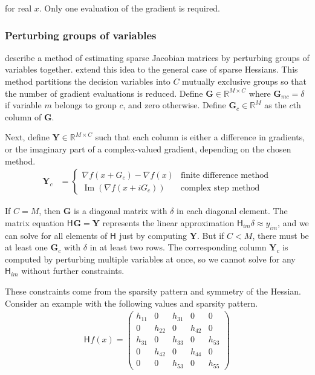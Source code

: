 \documentclass[jss]{jss}\usepackage[]{graphicx}\usepackage[]{color}
\newcommand{\hess}[2]{\mathsf{H}_{#1}#2}
\newcommand{\Mat}[1]{\mathbf{#1}}
\newcommand{\Real}[1]{\mathbb{R}^{#1}}
\DeclareMathOperator{\Imag}{Im}
\begin{document}
for real $x$.  Only one evaluation of the gradient is required.

\subsubsection[Perturbing groups of variables]{Perturbing groups of variables}

 describe a method of estimating sparse
Jacobian matrices by perturbing groups of variables together.
 extend this idea to the
general case of sparse Hessians.  This method partitions
the decision variables into $C$ mutually exclusive groups so that the number of gradient
evaluations is reduced.  Define $\Mat{G}\in\Real{M\times C}$ where $\Mat{G}_{mc}=\delta$ if variable $m$ belongs to group $c$, and zero
otherwise.  Define $\Mat{G}_c\in\Real{M}$ as the $c$th column of $\Mat{G}$.

Next, define $\Mat{Y}\in\Real{M\times C}$ such that each column is
either a difference in gradients, or the imaginary part of a
complex-valued gradient, depending on the chosen method.
\begin{align}
  \label{eq:Yg}
  \Mat{Y}_c&=
           \begin{cases}
             \nabla f(x+G_c)-\nabla f(x)&\text{finite difference method}\\
             \Imag(\nabla f(x+iG_c))&\text{complex step method}
             \end{cases}
\end{align}

If $C=M$, then $\Mat{G}$ is a diagonal matrix with $\delta$ in each
diagonal element.  The matrix equation $\hess{}{}\Mat{G}=\Mat{Y}$ represents the linear approximation
$\hess{im}{}\delta\approx y_{im}$, and we can solve for all elements of $\hess{}{}$
just by computing $\Mat{Y}$. But if $C<M$,
there must be at least one $\Mat{G}_c$ with $\delta$ in at least two
rows. The corresponding column $\Mat{Y}_c$ is computed by perturbing multiple variables at
once, so we cannot solve for any $\hess{im}{}$
without further constraints.

These constraints come from the sparsity pattern and symmetry
of the Hessian. Consider an example with the following values and
sparsity pattern.
\begin{align}
  \label{eq:7}
 \hess{}{f(x)}= \begin{pmatrix}
    h_{11}&0&h_{31}&0&0\\
    0&h_{22}&0&h_{42}&0\\
    h_{31}&0&h_{33}&0&h_{53}\\
    0&h_{42}&0&h_{44}&0\\
    0&0&h_{53}&0&h_{55}
  \end{pmatrix}
\end{align}
\end{document}
